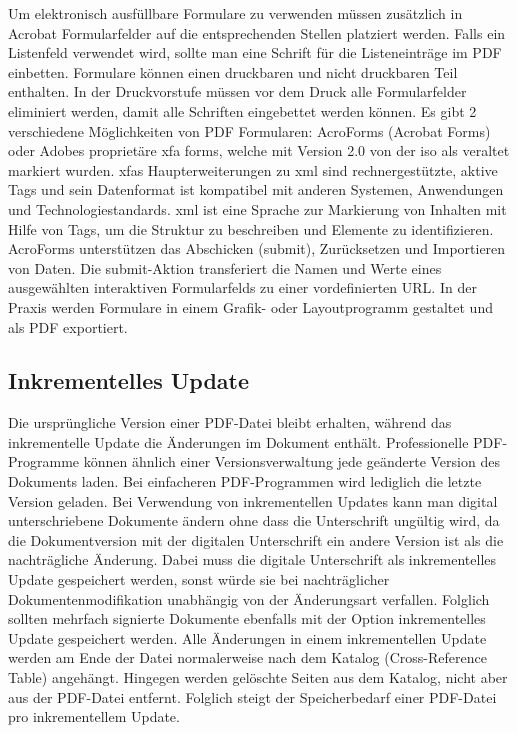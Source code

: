 Um elektronisch ausfüllbare Formulare zu verwenden müssen zusätzlich in Acrobat Formularfelder auf die entsprechenden Stellen platziert werden. Falls ein Listenfeld verwendet wird, sollte man eine Schrift für die Listeneinträge im PDF einbetten. Formulare können einen druckbaren und nicht druckbaren Teil enthalten. In der Druckvorstufe müssen vor dem Druck alle Formularfelder eliminiert werden, damit alle Schriften eingebettet werden können. \cite{schneeberger} Es gibt 2 verschiedene Möglichkeiten von PDF Formularen: AcroForms (Acrobat Forms) oder Adobes proprietäre \gls{xfa} forms, welche mit Version 2.0 von der \gls{iso} als veraltet markiert wurden. \gls{xfa}s Haupterweiterungen zu \gls{xml} sind rechnergestützte, aktive Tags und sein Datenformat ist kompatibel mit anderen Systemen, Anwendungen und Technologiestandards. \cite{wiki-xfa} \gls{xml} ist eine Sprache zur Markierung von Inhalten mit Hilfe von Tags, um die Struktur zu beschreiben und Elemente zu identifizieren. \cite{schneeberger} AcroForms unterstützen das Abschicken (submit), Zurücksetzen und Importieren von Daten. Die submit-Aktion transferiert die Namen und Werte eines ausgewählten interaktiven Formularfelds zu einer vordefinierten URL. In der Praxis werden Formulare in einem Grafik- oder Layoutprogramm gestaltet und als PDF exportiert.

\subsection{Inkrementelles Update}
Die ursprüngliche Version einer PDF-Datei bleibt erhalten, während das inkrementelle Update die Änderungen im Dokument enthält. Professionelle PDF-Programme können ähnlich einer Versionsverwaltung jede geänderte Version des Dokuments laden. Bei einfacheren PDF-Programmen wird lediglich die letzte Version geladen. Bei Verwendung von inkrementellen Updates kann man digital unterschriebene Dokumente ändern ohne dass die Unterschrift ungültig wird, da die Dokumentversion mit der digitalen Unterschrift ein andere Version ist als die nachträgliche Änderung. Dabei muss die digitale Unterschrift als inkrementelles Update gespeichert werden, sonst würde sie bei nachträglicher Dokumentenmodifikation unabhängig von der Änderungsart verfallen. Folglich sollten mehrfach signierte Dokumente ebenfalls mit der Option inkrementelles Update gespeichert werden. \cite{softx} Alle Änderungen in einem inkrementellen Update werden am Ende der Datei normalerweise nach dem Katalog (Cross-Reference Table) angehängt. Hingegen werden gelöschte Seiten aus dem Katalog, nicht aber aus der PDF-Datei entfernt. Folglich steigt der Speicherbedarf einer PDF-Datei pro inkrementellem Update. \cite{schneeberger} 

